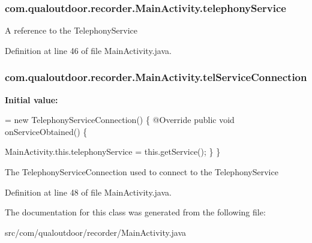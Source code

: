 \hypertarget{classcom_1_1qualoutdoor_1_1recorder_1_1MainActivity_afa74ca8ca4d439945c9b72e360004f13}{
\subsubsection[{telephony\-Service}]{ com.\-qualoutdoor.\-recorder.\-Main\-Activity.\-telephony\-Service\hspace{0.3cm}{\ttfamily [private]}}}\label{classcom_1_1qualoutdoor_1_1recorder_1_1MainActivity_afa74ca8ca4d439945c9b72e360004f13}
A reference to the Telephony\-Service 

Definition at line 46 of file Main\-Activity.\-java.

\hypertarget{classcom_1_1qualoutdoor_1_1recorder_1_1MainActivity_aee67fc3589f9ffcde9bdc275f9cdbac4}{
\subsubsection[{tel\-Service\-Connection}]{ com.\-qualoutdoor.\-recorder.\-Main\-Activity.\-tel\-Service\-Connection\hspace{0.3cm}{\ttfamily [private]}}}\label{classcom_1_1qualoutdoor_1_1recorder_1_1MainActivity_aee67fc3589f9ffcde9bdc275f9cdbac4}
{\bfseries Initial value\-:}
\begin{DoxyCode}
= \textcolor{keyword}{new} TelephonyServiceConnection() \{
        @Override
        \textcolor{keyword}{public} \textcolor{keywordtype}{void} onServiceObtained() \{
            
            MainActivity.this.telephonyService = this.getService();
        \}
    \}
\end{DoxyCode}
The Telephony\-Service\-Connection used to connect to the Telephony\-Service 

Definition at line 48 of file Main\-Activity.\-java.



The documentation for this class was generated from the following file\-:\begin{DoxyCompactItemize}
\item 
src/com/qualoutdoor/recorder/Main\-Activity.\-java\end{DoxyCompactItemize}
